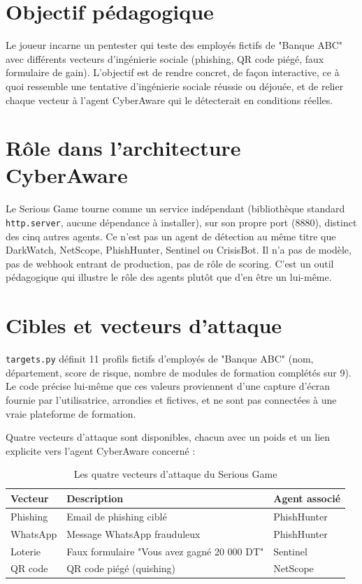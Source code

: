 \documentclass[12pt,a4paper]{report}
\begin{document}
\section{Objectif pédagogique}

Le joueur incarne un pentester qui teste des employés fictifs de "Banque ABC" avec différents vecteurs d'ingénierie sociale (phishing, QR code piégé, faux formulaire de gain). L'objectif est de rendre concret, de façon interactive, ce à quoi ressemble une tentative d'ingénierie sociale réussie ou déjouée, et de relier chaque vecteur à l'agent CyberAware qui le détecterait en conditions réelles.

\section{Rôle dans l'architecture CyberAware}

Le Serious Game tourne comme un service indépendant (bibliothèque standard \texttt{http.server}, aucune dépendance à installer), sur son propre port (8880), distinct des cinq autres agents. Ce n'est pas un agent de détection au même titre que DarkWatch, NetScope, PhishHunter, Sentinel ou CrisisBot. Il n'a pas de modèle, pas de webhook entrant de production, pas de rôle de scoring. C'est un outil pédagogique qui illustre le rôle des agents plutôt que d'en être un lui-même.

\section{Cibles et vecteurs d'attaque}

\texttt{targets.py} définit 11 profils fictifs d'employés de "Banque ABC" (nom, département, score de risque, nombre de modules de formation complétés sur 9). Le code précise lui-même que ces valeurs proviennent d'une capture d'écran fournie par l'utilisatrice, arrondies et fictives, et ne sont pas connectées à une vraie plateforme de formation.

Quatre vecteurs d'attaque sont disponibles, chacun avec un poids et un lien explicite vers l'agent CyberAware concerné :

\begin{table}[h]
\centering
\begin{tabular}{@{}lll@{}}
\toprule
\textbf{Vecteur} & \textbf{Description} & \textbf{Agent associé} \\
\midrule
Phishing & Email de phishing ciblé & PhishHunter \\
WhatsApp & Message WhatsApp frauduleux & PhishHunter \\
Loterie & Faux formulaire "Vous avez gagné 20 000 DT" & Sentinel \\
QR code & QR code piégé (quishing) & NetScope \\
\bottomrule
\end{tabular}
\caption{Les quatre vecteurs d'attaque du Serious Game}
\end{table}
\end{document}
